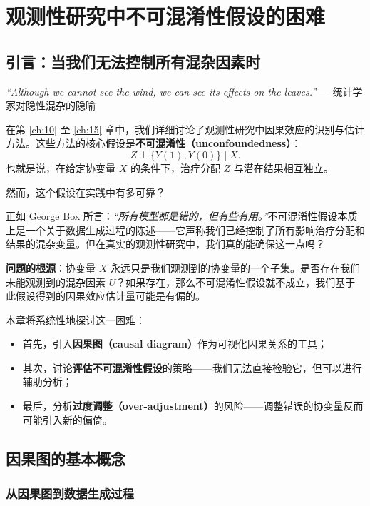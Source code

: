 
\chapter{观测性研究中不可混淆性假设的困难}\label{ch:16}

\section{引言：当我们无法控制所有混杂因素时}\label{sec:16-intro}

\textit{``Although we cannot see the wind, we can see its effects on the leaves.''}
--- 统计学家对隐性混杂的隐喻

在第 \ref{ch:10} 至 \ref{ch:15} 章中，我们详细讨论了观测性研究中因果效应的识别与估计方法。这些方法的核心假设是\textbf{不可混淆性（unconfoundedness）}：
\[
Z \perp \{Y(1), Y(0)\} \mid X .
\label{eq:16-unconfoundedness}
\tag{16.1}
\]
也就是说，在给定协变量 $X$ 的条件下，治疗分配 $Z$ 与潜在结果相互独立。

然而，这个假设在实践中有多可靠？

正如 George Box 所言：\textit{``所有模型都是错的，但有些有用。''}不可混淆性假设本质上是一个关于数据生成过程的陈述——它声称我们已经控制了所有影响治疗分配和结果的混杂变量。但在真实的观测性研究中，我们真的能确保这一点吗？

\textbf{问题的根源}：协变量 $X$ 永远只是我们观测到的协变量的一个子集。是否存在我们未能观测到的混杂因素 $U$？如果存在，那么不可混淆性假设就不成立，我们基于此假设得到的因果效应估计量可能是有偏的。

本章将系统性地探讨这一困难：
\begin{itemize}
  \item 首先，引入\textbf{因果图（causal diagram）}作为可视化因果关系的工具；
  \item 其次，讨论\textbf{评估不可混淆性假设}的策略——我们无法直接检验它，但可以进行辅助分析；
  \item 最后，分析\textbf{过度调整（over-adjustment）}的风险——调整错误的协变量反而可能引入新的偏倚。
\end{itemize}

\section{因果图的基本概念}\label{sec:16-causal-diagram}

\subsection{从因果图到数据生成过程}\label{sec:16-diagram-to-dgp}

